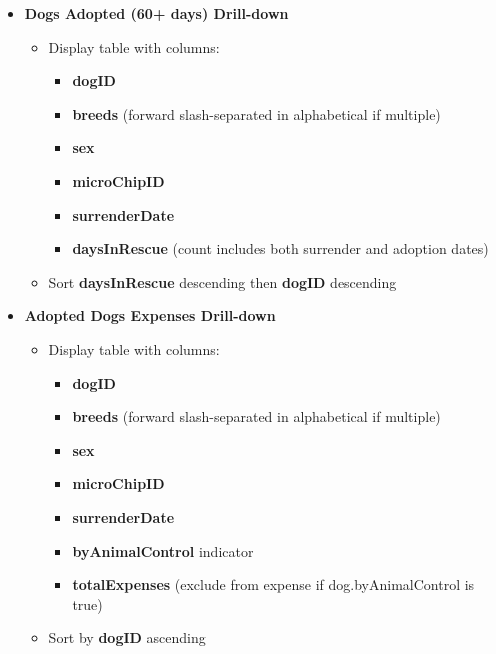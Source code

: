 \documentclass{article}
\begin{document}
\begin{itemize}
\begin{itemize}
\begin{itemize}
        \end{itemize}
    \end{itemize}
    \begin{itemize}
        \item \textbf{Dogs Adopted (60+ days) Drill-down}
        \begin{itemize}
            \item Display table with columns:
            \begin{itemize}
                \item \textbf{dogID}
                \item \textbf{breeds} (forward slash-separated in alphabetical if multiple)
                \item \textbf{sex}
                \item \textbf{microChipID}
                \item \textbf{surrenderDate}
                \item \textbf{daysInRescue} (count includes both surrender and adoption dates)
            \end{itemize}
            \item Sort \textbf{daysInRescue} descending then \textbf{dogID} descending
        \end{itemize}
    \end{itemize}
    \begin{itemize}
        \item \textbf{Adopted Dogs Expenses Drill-down}
        \begin{itemize}
            \item Display table with columns:
            \begin{itemize}
                \item \textbf{dogID}
                \item \textbf{breeds} (forward slash-separated in alphabetical if multiple)
                \item \textbf{sex}
                \item \textbf{microChipID}
                \item \textbf{surrenderDate}
                \item \textbf{byAnimalControl} indicator
                \item \textbf{totalExpenses} (exclude from expense if dog.byAnimalControl is true)
            \end{itemize}
            \item Sort by \textbf{dogID} ascending
        \end{itemize}
    \end{itemize}
\end{itemize} 
\end{document}
